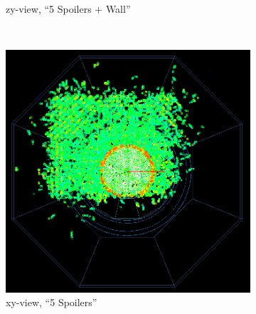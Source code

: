 \begin{figure}
\begin{subfigure}[b]{0.49\textwidth}
\begin{center}
        \caption{zy-view, ``5 Spoilers + Wall''}
        \label{fig:zy_5SpoilersWall}
    \end{center}
    \end{subfigure}\\
    \begin{subfigure}[b]{0.49\textwidth}
    \begin{center}
        \includegraphics[height=0.3\textheight]{figures/muons_positron_5spoilers_2961_xyview_croped.png}
        \caption{xy-view, ``5 Spoilers''}
	\label{fig:xy_5Spoilers}
    \end{center}
    \end{subfigure}
    \begin{subfigure}[b]{0.49\textwidth}
    \begin{center}

\end{center}
\end{subfigure}
\end{figure}
